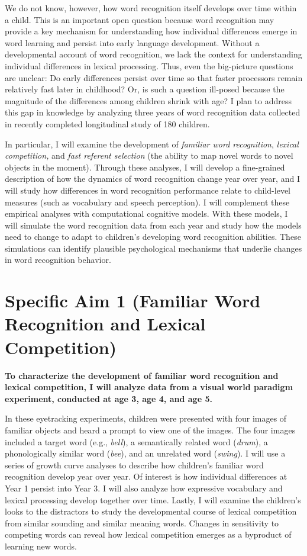 \documentclass [11pt, proquest] {uwthesis}[2015/03/03]
\begin{document}
We do not know, however, how word recognition itself develops over time
within a child. This is an important open question because word
recognition may provide a key mechanism for understanding how individual
differences emerge in word learning and persist into early language
development. Without a developmental account of word recognition, we
lack the context for understanding individual differences in lexical
processing. Thus, even the big-picture questions are unclear: Do early
differences persist over time so that faster processors remain
relatively fast later in childhood? Or, is such a question ill-posed
because the magnitude of the differences among children shrink with age?
I plan to address this gap in knowledge by analyzing three years of word
recognition data collected in recently completed longitudinal study of
180 children.

In particular, I will examine the development of \emph{familiar word
recognition}, \emph{lexical competition,} and \emph{fast referent
selection} (the ability to map novel words to novel objects in the
moment). Through these analyses, I will develop a fine-grained
description of how the dynamics of word recognition change year over
year, and I will study how differences in word recognition performance
relate to child-level measures (such as vocabulary and speech
perception). I will complement these empirical analyses with
computational cognitive models. With these models, I will simulate the
word recognition data from each year and study how the models need to
change to adapt to children's developing word recognition abilities.
These simulations can identify plausible psychological mechanisms that
underlie changes in word recognition behavior.

\section{Specific Aim 1 (Familiar Word Recognition and Lexical
Competition)}\label{specific-aim-1-familiar-word-recognition-and-lexical-competition}

\textbf{To characterize the development of familiar word recognition and
lexical competition, I will analyze data from a visual world paradigm
experiment, conducted at age 3, age 4, and age 5.}

In these eyetracking experiments, children were presented with four
images of familiar objects and heard a prompt to view one of the images.
The four images included a target word (e.g., \emph{bell}), a
semantically related word (\emph{drum}), a phonologically similar word
(\emph{bee}), and an unrelated word (\emph{swing}). I will use a series
of growth curve analyses to describe how children's familiar word
recognition develop year over year. Of interest is how individual
differences at Year 1 persist into Year 3. I will also analyze how
expressive vocabulary and lexical processing develop together over time.
Lastly, I will examine the children's looks to the distractors to study
the developmental course of lexical competition from similar sounding
and similar meaning words. Changes in sensitivity to competing words can
reveal how lexical competition emerges as a byproduct of learning new
words.
\end{document}

